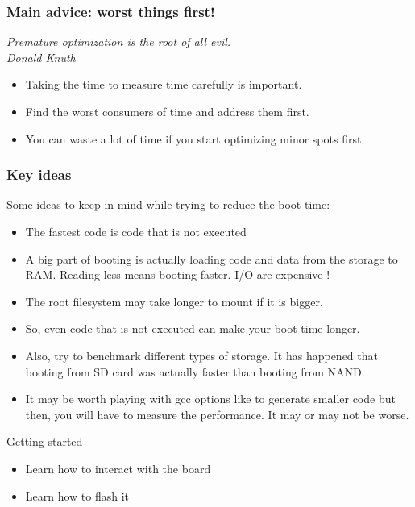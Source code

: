 \begin{frame}
\frametitle{Main advice: worst things first!}
{\em Premature optimization is the root of all evil.\\
Donald Knuth}     
\begin{itemize}
\item Taking the time to measure time carefully is important.
\item Find the worst consumers of time and address them first.
\item You can waste a lot of time if you start optimizing
      minor spots first.
\end{itemize}
\end{frame}


\begin{frame}
\frametitle{Key ideas}
Some ideas to keep in mind while trying to reduce the boot time:
\begin{itemize}
\item The fastest code is code that is not executed
\item A big part of booting is actually loading code and data from the
        storage to RAM. Reading less means booting faster. I/O are
        expensive !
\item The root filesystem may take longer to mount if it is bigger.
\item So, even code that is not executed can make your boot time
        longer.
\item Also, try to benchmark different types of storage. It has
        happened that booting from SD card was actually faster than
        booting from NAND.
\item It may be worth playing with gcc options like  to
generate
        smaller code but then, you will have to measure the performance.
        It may or may not be worse.
\end{itemize}
\end{frame}

\setuplabframe
{Getting started}
{
\begin{itemize}
\item Learn how to interact with the board
\item Learn how to flash it 
\end{itemize}
}

